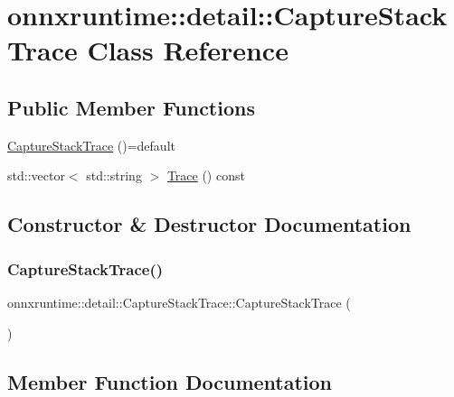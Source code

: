 \hypertarget{classonnxruntime_1_1detail_1_1CaptureStackTrace}{}\section{onnxruntime\+:\+:detail\+:\+:Capture\+Stack\+Trace Class Reference}
\label{classonnxruntime_1_1detail_1_1CaptureStackTrace}
\subsection*{Public Member Functions}
\begin{DoxyCompactItemize}
\item 
\mbox{\hyperlink{classonnxruntime_1_1detail_1_1CaptureStackTrace_a9ab1351b918408e9d45cc87c115ed250}{Capture\+Stack\+Trace}} ()=default
\item 
std\+::vector$<$ std\+::string $>$ \mbox{\hyperlink{classonnxruntime_1_1detail_1_1CaptureStackTrace_a85d02857b57ed3f2ace768a9c3f5b469}{Trace}} () const
\end{DoxyCompactItemize}


\subsection{Constructor \& Destructor Documentation}
\mbox{\label{classonnxruntime_1_1detail_1_1CaptureStackTrace_a9ab1351b918408e9d45cc87c115ed250}} 
\subsubsection{\texorpdfstring{Capture\+Stack\+Trace()}{CaptureStackTrace()}}
{\footnotesize\ttfamily onnxruntime\+::detail\+::\+Capture\+Stack\+Trace\+::\+Capture\+Stack\+Trace (\begin{DoxyParamCaption}{ }\end{DoxyParamCaption})\hspace{0.3cm}{\ttfamily [default]}}



\subsection{Member Function Documentation}
\mbox{\label{classonnxruntime_1_1detail_1_1CaptureStackTrace_a85d02857b57ed3f2ace768a9c3f5b469}} 
